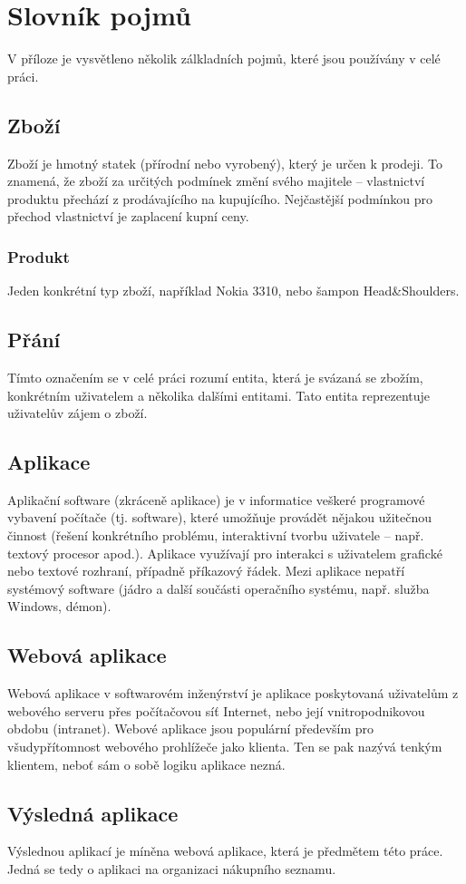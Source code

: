 \chapter{Slovník pojmů}
V příloze je vysvětleno několik zálkladních pojmů, které jsou používány v celé práci.
\section{Zboží}
Zboží je hmotný statek (přírodní nebo vyrobený), který je určen k prodeji. To znamená, že zboží za určitých podmínek změní svého majitele – vlastnictví produktu přechází z prodávajícího na kupujícího. Nejčastější podmínkou pro přechod vlastnictví je zaplacení kupní ceny.
\subsection{Produkt}
Jeden konkrétní typ zboží, například Nokia 3310, nebo šampon Head\&Shoulders.
\section{Přání}
Tímto označením se v celé práci rozumí entita, která je svázaná se zbožím, konkrétním uživatelem a několika dalšími entitami. Tato entita reprezentuje uživatelův zájem o zboží.

\section{Aplikace}
Aplikační software (zkráceně aplikace) je v informatice veškeré programové vybavení počítače (tj. software), které umožňuje provádět nějakou užitečnou činnost (řešení konkrétního problému, interaktivní tvorbu uživatele – např. textový procesor apod.). Aplikace využívají pro interakci s uživatelem grafické nebo textové rozhraní, případně příkazový řádek. Mezi aplikace nepatří systémový software (jádro a další součásti operačního systému, např. služba Windows, démon).

\section{Webová aplikace}
Webová aplikace v softwarovém inženýrství je aplikace poskytovaná uživatelům z webového serveru přes počítačovou síť Internet, nebo její vnitropodnikovou obdobu (intranet). Webové aplikace jsou populární především pro všudypřítomnost webového prohlížeče jako klienta. Ten se pak nazývá tenkým klientem, neboť sám o sobě logiku aplikace nezná.

\section{Výsledná aplikace}
Výslednou aplikací je míněna webová aplikace, která je předmětem této práce. Jedná se tedy o aplikaci na organizaci nákupního seznamu.
